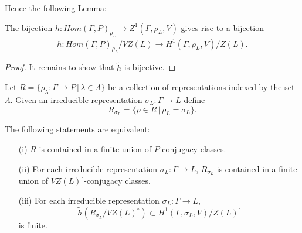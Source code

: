 Hence the following Lemma:

\begin{lemma}
  The bijection $h: Hom(\Gamma, P)_{\rho_L} \rightarrow Z^1(\Gamma, \rho_L, V)$ gives rise to a bijection
  \begin{displaymath}
    \tilde{h}: Hom(\Gamma, P)_{\rho_L}/VZ(L) \rightarrow H^1(\Gamma, \rho_L, V)/Z(L).
  \end{displaymath}
  \label{lem:vzl_h1zl}
\end{lemma}
\begin{proof}
  It remains to show that $\tilde{h}$ is bijective.
\end{proof}

\begin{lemma}
  Let $R = \{\rho_\lambda:\Gamma\rightarrow P\,|\,\lambda\in\Lambda\}$ be a collection of representations indexed by the set $\Lambda$. Given an irreducible representation $\sigma_L:\Gamma\rightarrow L$ define
  \begin{displaymath}
    R_{\sigma_L} = \{\rho \in R\,|\,\rho_L = \sigma_L\}. 
  \end{displaymath}
  
  The following statements are equivalent:
  \begin{itemize}
    \item[(i)] $R$ is contained in a finite union of $P$-conjugacy classes.
    \item[(ii)] For each irreducible representation $\sigma_L:\Gamma\rightarrow L$, $R_{\sigma_L}$ is contained in a finite union of $VZ(L)^\circ$-conjugacy classes.
    \item[(iii)] For each irreducible representation $\sigma_L:\Gamma\rightarrow L$,
      \begin{displaymath}
	\tilde{h}(R_{\sigma_L}/VZ(L)^\circ) \subset H^{1}(\Gamma,\sigma_L,V)/Z(L)^\circ
      \end{displaymath}
      is finite.
  \end{itemize}
  \label{lem:p_h1}
\end{lemma}
